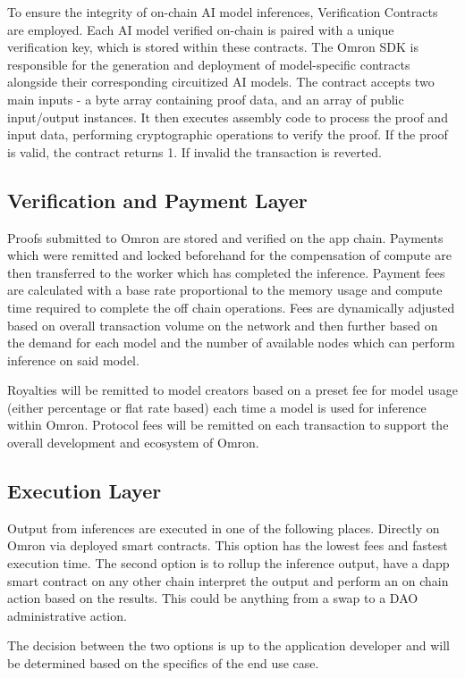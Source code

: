 \documentclass[conference]{IEEEtran}
\begin{document}
To ensure the integrity of on-chain AI model inferences, Verification Contracts are employed. Each AI model verified on-chain is paired with a unique verification key, which is stored within these contracts. The Omron SDK is responsible for the generation and deployment of model-specific contracts alongside their corresponding circuitized AI models. The contract accepts two main inputs - a byte array containing proof data, and an array of public input/output instances. It then executes assembly code to process the proof and input data, performing cryptographic operations to verify the proof.  If the proof is valid, the contract returns 1. If invalid the transaction is reverted.

\subsection{Verification and Payment Layer}
Proofs submitted to Omron are stored and verified on the app chain. Payments which were remitted and locked beforehand for the compensation of compute are then transferred to the worker which has completed the inference. Payment fees are calculated with a base rate proportional to the memory usage and compute time required to complete the off chain operations. Fees are dynamically adjusted based on overall transaction volume on the network and then further based on the demand for each model and the number of available nodes which can perform inference on said model.

Royalties will be remitted to model creators based on a preset fee for model usage (either percentage or flat rate based) each time a model is used for inference within Omron. Protocol fees will be remitted on each transaction to support the overall development and ecosystem of Omron.

\subsection{Execution Layer}
Output from inferences are executed in one of the following places. Directly on Omron via deployed smart contracts. This option has the lowest fees and fastest execution time. The second option is to rollup the inference output, have a dapp smart contract on any other chain interpret the output and perform an on chain action based on the results. This could be anything from a swap to a DAO administrative action.

The decision between the two options is up to the application developer and will be determined based on the specifics of the end use case.
\end{document}
